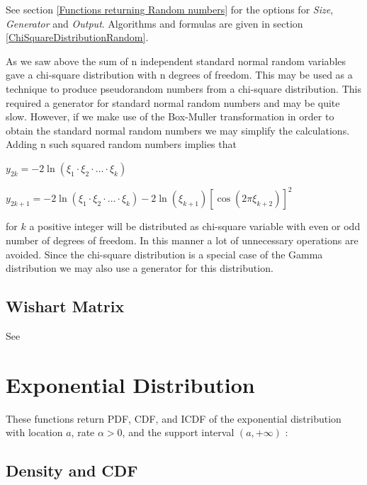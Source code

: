 \vspace{0.3cm}
See section \ref{Functions returning Random numbers} for the options for  {\itshape\sffamily Size},  {\itshape\sffamily Generator} and {\itshape\sffamily Output}. Algorithms and formulas are given in section \ref{ChiSquareDistributionRandom}.


\vspace{0.3cm}
As we saw above the sum of n independent standard normal random variables gave a
chi-square distribution with n degrees of freedom. This may be used as a technique to
produce pseudorandom numbers from a chi-square distribution. This required a generator
for standard normal random numbers and may be quite slow. However, if we make use of
the Box-Muller transformation in order to obtain the standard normal random numbers
we may simplify the calculations.
Adding n such squared random numbers implies that

\begin{center}
	
	$y_{2k} = -2 \ln(\xi_1 \cdot \xi_2 \cdot \ldots \cdot \xi_k)$
	
	$y_{2k+1} = -2\ln(\xi_1 \cdot \xi_2 \cdot \ldots \cdot \xi_k) - 2\ln(\xi_{k+1}) [\cos(2\pi\xi_{k+2})]^2$
	
	
\end{center}
for $k$ a positive integer will be distributed as chi-square variable with even or odd number
of degrees of freedom. In this manner a lot of unnecessary operations are avoided.
Since the chi-square distribution is a special case of the Gamma distribution we may
also use a generator for this distribution.



\subsection{Wishart Matrix}

See \cite{gleser1976}




\newpage
\section{Exponential Distribution}
\label{ExponentialDistribution}


These functions return PDF, CDF, and ICDF of the exponential distribution with
location $a$, rate $\alpha > 0$, and the support interval $(a,+\infty)$ :




\subsection{Density and CDF}

